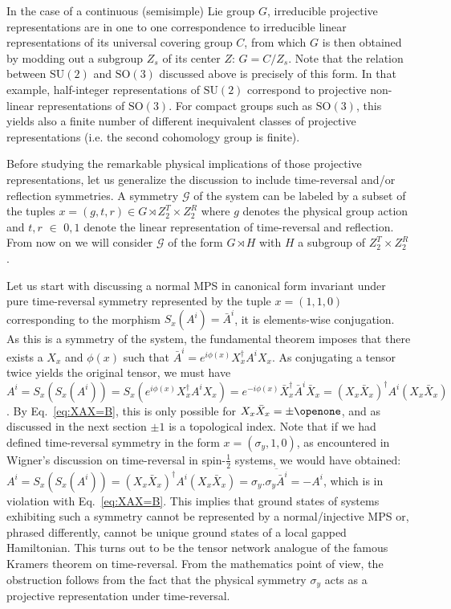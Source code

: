 \documentclass[rmp,aps,reprint,superscriptaddress,nobalancelastpage]{revtex4-1}
\def\Id{{\openone}}
\newcommand{\SO}{\mathrm{SO}}
\newcommand{\SU}{\mathrm{SU}}
\begin{document}
In the case of a continuous (semisimple) Lie group $G$, irreducible projective representations are in one to one correspondence to irreducible linear representations of its universal covering group $C$, from which $G$ is then obtained by modding out a subgroup $Z_s$ of its center $Z$:   $G=C/Z_s$. Note that the relation between $\SU(2)$ and $\SO(3)$ discussed above is precisely of this form. In that example, half-integer representations of $\SU(2)$ correspond to projective non-linear representations of $\SO(3)$. For compact groups such as $\SO(3)$, this yields also a finite number of different inequivalent classes of projective representations (i.e. the second cohomology group is finite).


Before studying the remarkable physical implications of those projective representations, let us generalize the discussion to include time-reversal and/or reflection symmetries. A symmetry $\mathcal{G}$ of the system can be labeled by a subset of the tuples $x=(g,t,r)\in G\rtimes Z_2^T\times Z_2^R$ where $g$ denotes the physical group action and $t,r$ $\in$ $0,1$ denote the linear representation of time-reversal and reflection. From now on we will consider $\mathcal{G}$ of the form $G\rtimes H$ with $H$ a subgroup of $Z_2^T\times Z_2^R$.

Let us start with  discussing a  normal MPS in canonical form invariant under pure time-reversal symmetry represented by the tuple $x=(1,1,0)$ corresponding to the morphism $S_x(A^i)=\bar{A}^i$, it is elements-wise conjugation. As this is a symmetry of the system, the fundamental theorem imposes that there exists a $X_x$ and $\phi(x)$ such that $\bar{A}^i=e^{i\phi(x)}X^\dagger_xA^iX_x$. As conjugating a tensor twice yields the original tensor, we must have
$A^i=S_x(S_x(A^i))=S_x(e^{i\phi(x)}X^\dagger_xA^iX_x)=e^{-i\phi(x)}\bar{X}_x^\dagger\bar{A}^i\bar{X}_x=(X_x\bar{X}_x)^\dagger A^i (X_x\bar{X}_x)$. By Eq.~\eqref{eq:XAX=B}, this is only possible for $X_x\bar{X}_x=\pm\Id$, and as discussed in the next section $\pm 1$ is a topological index. Note that if we had defined time-reversal symmetry in the form $x=(\sigma_y,1,0)$, as encountered in Wigner's discussion on time-reversal in spin-$\tfrac12$ systems, we would have obtained: $A^i=S_x(S_x(A^i))=(X_x\bar{X}_x)^\dagger A^i (X_x\bar{X}_x)=\sigma_y.\overline{\sigma_y\bar{A}^i}=-A^i$, which is in violation with Eq.~\eqref{eq:XAX=B}. This implies that ground states of systems exhibiting such a symmetry cannot be represented by a normal/injective MPS or, phrased differently, cannot be unique ground states of a local gapped Hamiltonian. This turns out to be the tensor network analogue of the famous Kramers theorem on time-reversal. From the mathematics point of view, the obstruction follows from the fact that the physical symmetry $\sigma_y$ acts as a projective representation under time-reversal.
\end{document}

